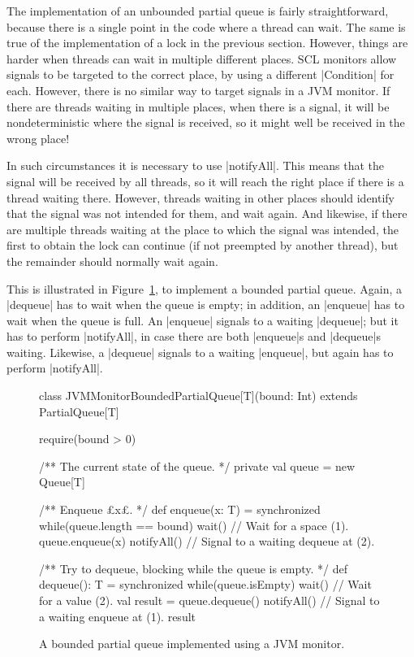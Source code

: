 The implementation of an unbounded partial queue is fairly straightforward,
because there is a single point in the code where a thread can wait.  The same
is true of the implementation of a lock in the previous section.  However,
things are harder when threads can wait in multiple different places.  SCL
monitors allow signals to be targeted to the correct place, by using a
different |Condition| for each.  However, there is no similar way to target
signals in a JVM monitor.  If there are threads waiting in multiple places,
when there is a signal, it will be nondeterministic where the signal is
received, so it might well be received in the wrong place!

In such circumstances it is necessary to use |notifyAll|.  This means that the
signal will be received by all threads, so it will reach the right place if
there is a thread waiting there.  However, threads waiting in other places
should identify that the signal was not intended for them, and wait again.
And likewise, if there are multiple threads waiting at the place to which the
signal was intended, the first to obtain the lock can continue (if not
preempted by another thread), but the remainder should normally wait again.

This is illustrated in Figure~\ref{fig:bounded-partial-queue-JVM-monitor}, to
implement a bounded partial queue.  Again, a |dequeue| has to wait when the
queue is empty; in addition, an |enqueue| has to wait when the queue is full.
An |enqueue| signals to a waiting |dequeue|; but it has to perform
|notifyAll|, in case there are both |enqueue|s and |dequeue|s waiting.
Likewise, a |dequeue| signals to a waiting |enqueue|, but again has to perform
|notifyAll|.  



\begin{figure}
\begin{scala}
class JVMMonitorBoundedPartialQueue[T](bound: Int) extends PartialQueue[T]{
  require(bound > 0)

  /** The current state of the queue. */
  private val queue = new Queue[T]

  /** Enqueue £x£. */
  def enqueue(x: T) = synchronized{ 
    while(queue.length == bound) wait() // Wait for a space (1).
    queue.enqueue(x)
    notifyAll() // Signal to a waiting dequeue at (2).
  }

  /** Try to dequeue, blocking while the queue is empty.  */
  def dequeue(): T = synchronized{ 
    while(queue.isEmpty) wait() // Wait for a value (2).
    val result = queue.dequeue() 
    notifyAll() // Signal to a waiting enqueue at (1).
    result
  }
}
\end{scala}
\caption{A bounded partial queue implemented using a JVM monitor.}
\label{fig:bounded-partial-queue-JVM-monitor}
\end{figure}

